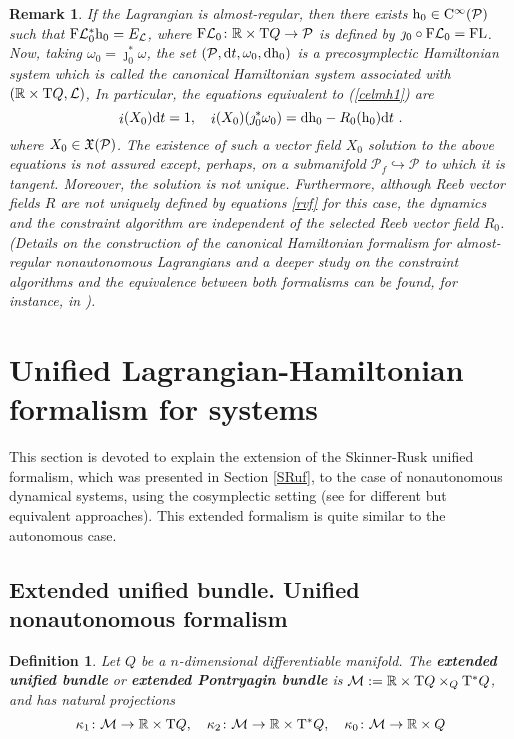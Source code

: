 \documentclass[12pt]{report}
\newtheorem{definition}[teor]{Definition}
\newtheorem{remark}[teor]{Remark}
\def\vf{\mathfrak X}
\def\Lag{{\cal L}}
\def\d{{\rm d}}
\def\Real{\mathbb{R}}
\def\Tan{{\rm T}}
\def\inn{\mathop{i}\nolimits}
\def\Cinfty{{\rm C}^\infty}
\begin{document}
\begin{remark}{\rm 
If the Lagrangian is almost-regular, then there exists
${\rm h}_0\in\Cinfty(\mathcal{P})$ such that 
${\rm F}\Lag_0^*{\rm h}_0=E_\Lag$, where
${\rm F}\Lag_0\colon\Real\times\Tan Q\to \mathcal{P}$ is defined by
$\jmath_0\circ{\rm F}\Lag_0={\rm FL}$. 
Now, taking $\omega_0=\jmath_0^*\omega$, the set
$(\mathcal{P},\d t,\omega_0,\d{\rm h}_0)$ is a precosymplectic 
Hamiltonian system which is called the {\sl canonical Hamiltonian system}
associated with $(\Real\times\Tan Q,\Lag)$, 
In particular, the equations equivalent to (\ref{celmh1}) are
$$
\inn(X_0)\d t=1,\quad
\inn(X_0)(\jmath_0^*\omega_0) =
\d {\rm h}_0-R_0({\rm h}_0)\d t \  .
$$
where $X_0\in\vf({\cal P})$. The existence of such a vector field
$X_0$ solution to the above equations is not
assured except, perhaps, on a submanifold 
$\mathcal{P}_f\hookrightarrow \mathcal{P}$
to which it is tangent. Moreover, the solution is not unique.
Furthermore, although Reeb vector fields $R$ are not uniquely defined by
equations \eqref{rvf} for this case,
the dynamics and the constraint algorithm are independent 
of the selected Reeb vector field $R_0$.
(Details on the construction of the canonical Hamiltonian formalism for
almost-regular nonautonomous Lagrangians and a deeper study on the constraint algorithms 
and the equivalence between both formalisms
can be found, for instance, in
\cite{CF-93,CLM-94,HL-dstd,LMM-96b,LMMMR-02,Vig-00}).
}\end{remark}


\section{Unified Lagrangian-Hamiltonian formalism for  systems}


This section is devoted to explain the extension of the 
Skinner-Rusk unified formalism, which was presented in
Section \ref{SRuf}, to the case of nonautonomous dynamical systems, using the cosymplectic setting
(see \cite{BEMMR-2008,CMC-2002,GM-05}
for different but equivalent approaches).
This extended formalism is quite similar to the autonomous case.


\subsection{Extended unified bundle. Unified nonautonomous formalism}


\begin{definition}
Let $Q$ be a $n$-dimensional differentiable manifold.
The \textbf{extended unified bundle} or \textbf{extended Pontryagin bundle} is
 ${\mathcal M}:=
 \Real\times\Tan Q \times_Q\Tan^*Q$, and has natural projections
$$
\kappa_1\colon{\mathcal M} \to\Real \times\Tan Q ,\quad
\kappa_2\colon{\mathcal M} \to\Real \times\Tan^*Q ,\quad
\kappa_0\colon{\mathcal M} \to\Real \times Q 
$$
\end{definition}
\end{document}
